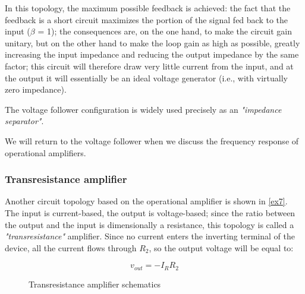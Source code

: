 \documentclass[../main.tex]{subfiles}
\begin{document}
In this topology, the maximum possible feedback is achieved: the fact that the feedback is a short circuit maximizes the portion of the signal fed back to the input ($\beta$ = 1); the consequences are, on the one hand, to make the circuit gain unitary, but on the other hand to make the loop gain as high as possible, greatly increasing the input impedance and reducing the output impedance by the same factor; this circuit will therefore draw very little current from the input, and at the output it will essentially be an ideal voltage generator (i.e., with virtually zero impedance).

The voltage follower configuration is widely used precisely as an \textit{"impedance separator"}. 

We will return to the voltage follower when we discuss the frequency response of operational amplifiers.


\subsubsection{Transresistance amplifier}


Another circuit topology based on the operational amplifier is shown
in \autoref{ex7}.
The input is current-based, the output is voltage-based; since the ratio between the output and the input is dimensionally a resistance, this topology is called a \textit{"transresistance"} amplifier. Since no current enters the inverting terminal of the device, all the current flows through $R_2$, so the output voltage will be equal to:

\begin{equation}
	v_{out} = -I_RR_2
\end{equation}

\begin{figure}[h]
\begin{center}



\label{ex7}
\caption{Transresistance amplifier schematics}	
\end{center}	
\end{figure}
\end{document}
